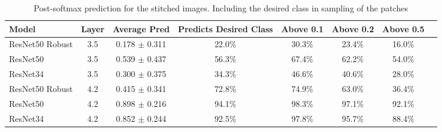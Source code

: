 %
%





\begin{table*}[t]
\caption{Post-softmax prediction for the stitched images. Including the desired class in sampling of the patches}
\label{tab:data_vis_test}
\vskip 0.15in
\begin{center}
\begin{small}
\begin{sc}
\begin{tabular}{lccccccc}
\toprule
Model & Layer & Average Pred & Predicts Desired Class & Above 0.1 & Above 0.2 & Above 0.5 \\
\midrule
ResNet50 Robust  & 3.5  & 0.178 $\pm$ 0.311 & 22.0\% & 30.3\% & 23.4\% & 16.0\% \\
ResNet50    & 3.5 & 0.539 $\pm$ 0.437 & 56.3\% & 67.4\% & 62.2\% & 54.0\% \\
ResNet34    & 3.5 & 0.300 $\pm$ 0.375 & 34.3\% & 46.6\% & 40.6\% & 28.0\% \\

ResNet50 Robust  & 4.2  & 0.415 $\pm$ 0.341 & 72.8\% & 74.9\% & 63.0\% & 36.4\% \\
ResNet50    & 4.2 & 0.898 $\pm$ 0.216 & 94.1\% & 98.3\% & 97.1\% & 92.1\% \\
ResNet34    & 4.2 & 0.852 $\pm$ 0.244 & 92.5\% & 97.8\% & 95.7\% & 88.4\% \\
\bottomrule
\end{tabular}
\end{sc}
\end{small}
\end{center}
\vskip -0.1in
\end{table*}


